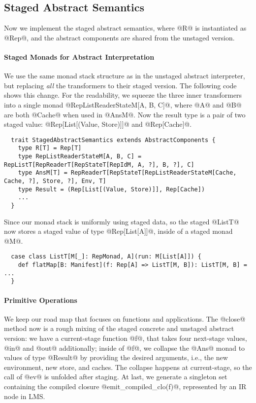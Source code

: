 \subsection{Staged Abstract Semantics}

Now we implement the staged abstract semantics, where @R@ is instantiated as
@Rep@, and the abstract components are shared from the unstaged version.

\paragraph{Staged Monads for Abstract Interpretation}
We use the same monad stack structure as in the unstaged abstract interpreter,
but replacing \textit{all} the transformers to their staged version. The
following code shows this change. For the readability, we squeeze the three
inner transformers into a single monad @RepListReaderStateM[A, B, C]@, where @A@
and @B@ are both @Cache@ when used in @AnsM@. Now the result type is a pair of
two staged value: @Rep[List[(Value, Store)]]@ and @Rep[Cache]@.

\begin{lstlisting}
  trait StagedAbstractSemantics extends AbstractComponents {
    type R[T] = Rep[T]
    type RepListReaderStateM[A, B, C] = RepListT[RepReaderT[RepStateT[RepIdM, A, ?], B, ?], C]
    type AnsM[T] = RepReaderT[RepStateT[RepListReaderStateM[Cache, Cache, ?], Store, ?], Env, T]
    type Result = (Rep[List[(Value, Store)]], Rep[Cache])
    ...
  }
\end{lstlisting}

Since our monad stack is uniformly using staged data, so the staged @ListT@ now
stores a staged value of type @Rep[List[A]]@, inside of a staged monad @M@.

\begin{lstlisting}
  case class ListT[M[_]: RepMonad, A](run: M[List[A]]) {
    def flatMap[B: Manifest](f: Rep[A] => ListT[M, B]): ListT[M, B] = ...
  }
\end{lstlisting}

\paragraph{Primitive Operations} We keep our road map that focuses on functions
and applications. The @close@ method now is a rough mixing of the staged
concrete and unstaged abstract version: we have a current-stage function @f@,
that takes four next-stage values, @in@ and @out@ additionally; inside of @f@,
we collapse the @Ans@ monad to values of type @Result@ by providing the desired
arguments, i.e., the new environment, new store, and caches. The collapse
happens at current-stage, so the call of @ev@ is unfolded after staging. At
last, we generate a singleton set containing the compiled closure
@emit_compiled_clo(f)@, represented by an IR node in LMS.

